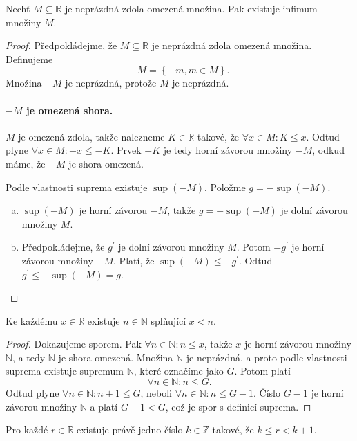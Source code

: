 \begin{veta}\label{veta1.6}
Nechť $M\subseteq\mathbb{R}$ je neprázdná zdola omezená množina.
Pak existuje infimum množiny $M$.
\end{veta}

\begin{proof}
	Předpokládejme, že $M\subseteq \mathbb R $ je neprázdná zdola omezená množina. Definujeme
	$$
	    -M = \left \{ -m, m \in M \right \}.
	$$
	Množina $-M$ je neprázdná, protože $M$ je neprázdná.
	\paragraph{$-M$ je omezená shora.} $M$ je omezená zdola, takže nalezneme $K\in \mathbb R $ takové, že
	$\forall x\in M: K\leq x$. Odtud plyne $\forall x\in M: -x \leq -K$. Prvek $-K$ je tedy horní závorou množiny $-M$, odkud máme,
	že $-M$ je shora omezená.
	\par Podle vlastnosti suprema existuje $\sup(-M)$. Položme $g=-\sup(-M)$.
	\begin{enumerate}[(a)]
		\item $\sup(-M)$ je horní závorou $-M$, takže $g=-\sup (-M)$ je dolní závorou množiny $M$.
		\item Předpokládejme, že $g^\prime$ je dolní závorou množiny $M$. Potom $-g^\prime$ je horní závorou množiny $-M$.
		Platí, že $\sup(-M)\leq -g^\prime$. Odtud $g^\prime \leq -\sup (-M)=g$.\qedhere
\end{enumerate}
\end{proof}

\begin{veta}\label{veta1.7}
	Ke každému $x \in \mathbb R $ existuje $n \in \mathbb N $ splňující $x<n$.
\end{veta}

\begin{proof}
	Dokazujeme sporem. Pak $\forall n\in \mathbb N : n\leq x$, takže $x$ je horní závorou množiny $\mathbb N $,
	a tedy $\mathbb N $ je shora omezená. Množina $\mathbb N $ je neprázdná, a proto podle vlastnosti suprema existuje supremum
	$\mathbb N $, které označíme jako $G$. Potom platí
	$$
	    \forall n\in \mathbb N : n\leq G.
	$$
	Odtud plyne $\forall n\in \mathbb N : n+1 \leq G$, neboli $\forall  n\in \mathbb N :n\leq G-1$. Číslo
	$G-1$ je horní závorou množiny $\mathbb N $ a platí $G-1<G$, což je spor s definicí suprema.
\end{proof}

\begin{veta}\label{veta1.8}
	Pro každé $r \in \mathbb R $ existuje právě jedno číslo $k\in \mathbb Z $ takové, že $k\leq r<k+1$.
\end{veta}

